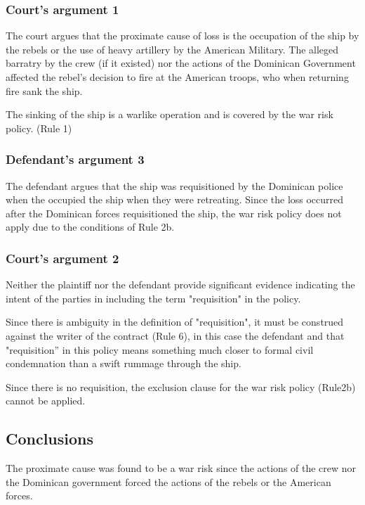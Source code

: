 \subsubsection{Court's argument 1}

The court argues that the proximate cause of loss is the occupation of the ship by the rebels or the use of heavy artillery by the American Military. The alleged barratry by the crew (if it existed) nor the actions of the Dominican Government affected the rebel's decision to fire at the American troops, who when returning fire sank the ship.

The sinking of the ship is a warlike operation and is covered by the war risk policy. (Rule 1)

\subsubsection{Defendant's argument 3}

The defendant argues that the ship was requisitioned by the Dominican police when the occupied the ship when they were retreating. Since the loss occurred after the Dominican forces requisitioned the ship, the war risk policy does not apply due to the conditions of Rule 2b.

\subsubsection{Court's argument 2}

Neither the plaintiff nor the defendant provide significant evidence  indicating the intent of the parties in including the term "requisition" in the policy. 

Since there is ambiguity in the definition of "requisition", it must be construed against the writer of the contract (Rule 6), in this case the defendant and that "requisition” in this policy means something much closer to formal civil condemnation than a swift rummage through the ship.

Since there is no requisition, the exclusion clause for the war risk policy (Rule2b) cannot be applied. 

\subsection{Conclusions}

The proximate cause was found to be a war risk since the actions of the crew nor the Dominican government forced the actions of the rebels or the American forces.


